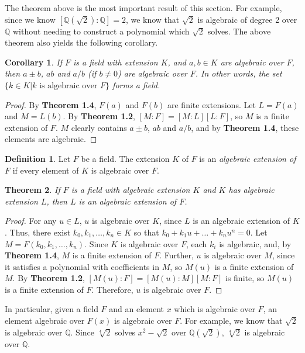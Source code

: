 \documentclass[12pt,leqno]{article}
\numberwithin{equation}{section}
\theoremstyle{plain}
\newtheorem{thm}{Theorem}[section]
\newtheorem{cor}[thm]{Corollary}
\theoremstyle{definition}
\newtheorem*{Def}{Definition}
\theoremstyle{remark}
\begin{document}
The theorem above is the most important result of this section. For example, since we know $[\mathbb{Q}(\sqrt{2}):\mathbb{Q}]=2$, we know that $\sqrt{2}$ is algebraic of degree 2 over $\mathbb{Q}$ without needing to construct a polynomial which $\sqrt{2}$ solves. The above theorem also yields the following corollary.

\begin{cor}
 If $F$ is a field with extension $K$, and $a,b\in K$ are algebraic over $F$, then $a\pm b$, $ab$ and $a/b$ (if $b\not=0$) are algebraic over $F$. In other words, the set $\{k\in K|k\text{ is algebraic over }F\}$ forms a field.
\end{cor}

\begin{proof}
 By \textbf{Theorem 1.4}, $F(a)$ and $F(b)$ are finite extensions. Let $L=F(a)$ and $M=L(b)$. By \textbf{Theorem 1.2}, $[M:F]=[M:L][L:F]$, so $M$ is a finite extension of $F$. $M$ clearly contains $a\pm b$, $ab$ and $a/b$, and by \textbf{Theorem 1.4}, these elements are algebraic.
\end{proof}

\begin{Def}
 Let $F$ be a field. The extension $K$ of $F$ is an \textit{algebraic extension of $F$} if every element of $K$ is algebraic over $F$. 
\end{Def}

\begin{thm}
 If $F$ is a field with algebraic extension $K$ and $K$ has algebraic extension $L$, then $L$ is an algebraic extension of $F$. 
\end{thm}

\begin{proof}
 For any $u\in L$, $u$ is algebraic over $K$, since $L$ is an algebraic extension of $K$. Thus, there exist $k_0,k_1,\hdots,k_n\in K$ so that $k_0+k_1u+\hdots+k_nu^n=0$. Let $M=F(k_0,k_1,\hdots,k_n)$. Since $K$ is algebraic over $F$, each $k_i$ is algebraic, and, by \textbf{Theorem 1.4}, $M$ is a finite extension of $F$. Further, $u$ is algebraic over $M$, since it satisfies a polynomial with coefficients in $M$, so $M(u)$ is a finite extension of $M$. By \textbf{Theorem 1.2}, $[M(u):F]=[M(u):M][M:F]$ is finite, so $M(u)$ is a finite extension of $F$. Therefore, $u$ is algebraic over $F$.
\end{proof}

In particular, given a field $F$ and an element $x$ which is algebraic over $F$, an element algebraic over $F(x)$ is algebraic over $F$. For example, we know that $\sqrt{2}$ is algebraic over $\mathbb{Q}$. Since $\sqrt[4]{2}$ solves $x^2-\sqrt{2}$ over $\mathbb{Q}(\sqrt{2})$, $\sqrt[4]{2}$ is algebraic over $\mathbb{Q}$.
\end{document}
